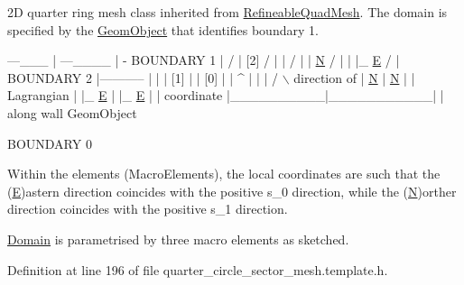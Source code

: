 2D quarter ring mesh class inherited from \hyperlink{classoomph_1_1RefineableQuadMesh}{Refineable\+Quad\+Mesh}. The domain is specified by the \hyperlink{classoomph_1_1GeomObject}{Geom\+Object} that identifies boundary 1.


\begin{DoxyCode}
                     ---\_\_\_
                    |      ---\_\_\_\_
                    |              -   BOUNDARY 1
                    |               /  
                    |     [2]      /  |  
                    |             /     | 
                    | \hyperlink{namespaceoomph_1_1QuadTreeNames_a8954a5947b19986b8c4b755bc7639f7dabc60bec4cc294aa2adf92726c6d6823a}{N}          /        |  
                    | |\_ \hyperlink{namespaceoomph_1_1QuadTreeNames_a8954a5947b19986b8c4b755bc7639f7da585070bd0e3801c3bbed287ef3c4a265}{E}      /          |    
     BOUNDARY 2     |-----------           |  
                    |          |    [1]    |
                    |   [0]    |           |  ^
                    |          |           | / \(\backslash\)  direction of
                    | \hyperlink{namespaceoomph_1_1QuadTreeNames_a8954a5947b19986b8c4b755bc7639f7dabc60bec4cc294aa2adf92726c6d6823a}{N}        |    \hyperlink{namespaceoomph_1_1QuadTreeNames_a8954a5947b19986b8c4b755bc7639f7dabc60bec4cc294aa2adf92726c6d6823a}{N}      |  |   Lagrangian 
                    | |\_ \hyperlink{namespaceoomph_1_1QuadTreeNames_a8954a5947b19986b8c4b755bc7639f7da585070bd0e3801c3bbed287ef3c4a265}{E}     |    |\_ \hyperlink{namespaceoomph_1_1QuadTreeNames_a8954a5947b19986b8c4b755bc7639f7da585070bd0e3801c3bbed287ef3c4a265}{E}   |  |   coordinate 
                    |\_\_\_\_\_\_\_\_\_\_|\_\_\_\_\_\_\_\_\_\_\_|  |   along wall GeomObject

                         BOUNDARY 0

Within the elements (MacroElements), the local coordinates
are such that the (\hyperlink{namespaceoomph_1_1QuadTreeNames_a8954a5947b19986b8c4b755bc7639f7da585070bd0e3801c3bbed287ef3c4a265}{E})astern direction coincides with the positive 
s\_0 direction,  \textcolor{keywordflow}{while} the (\hyperlink{namespaceoomph_1_1QuadTreeNames_a8954a5947b19986b8c4b755bc7639f7dabc60bec4cc294aa2adf92726c6d6823a}{N})orther direction coincides with the positive 
s\_1 direction.
\end{DoxyCode}


\hyperlink{classoomph_1_1Domain}{Domain} is parametrised by three macro elements as sketched. 

Definition at line 196 of file quarter\+\_\+circle\+\_\+sector\+\_\+mesh.\+template.\+h.



